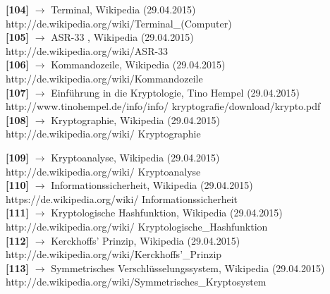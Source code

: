 \documentclass[12pt,a4paper]{report}
\begin{document}
\begin{onehalfspace}
\noindent
\textbf{[104]} $\rightarrow$ Terminal, Wikipedia (29.04.2015)\\
http://de.wikipedia.org/wiki/Terminal\_(Computer)\\

\noindent
\textbf{[105]} $\rightarrow$ ASR-33 , Wikipedia (29.04.2015)\\
http://de.wikipedia.org/wiki/ASR-33\\

\noindent
\textbf{[106]} $\rightarrow$ Kommandozeile, Wikipedia (29.04.2015)\\
http://de.wikipedia.org/wiki/Kommandozeile\\

\noindent
\textbf{[107]} $\rightarrow$ Einführung in die
Kryptologie, Tino Hempel (29.04.2015)\\
http://www.tinohempel.de/info/info/ kryptografie/download/krypto.pdf\\

\noindent
\textbf{[108]} $\rightarrow$ Kryptographie, Wikipedia (29.04.2015)\\
http://de.wikipedia.org/wiki/ Kryptographie\\

\newpage

\noindent
\textbf{[109]} $\rightarrow$ Kryptoanalyse, Wikipedia (29.04.2015)\\
http://de.wikipedia.org/wiki/ Kryptoanalyse\\

\noindent
\textbf{[110]} $\rightarrow$ Informationssicherheit, Wikipedia (29.04.2015)\\
https://de.wikipedia.org/wiki/ Informationssicherheit\\

\noindent
\textbf{[111]} $\rightarrow$ Kryptologische Hashfunktion, Wikipedia (29.04.2015)\\
http://de.wikipedia.org/wiki/ Kryptologische\_Hashfunktion\\

\noindent
\textbf{[112]} $\rightarrow$ Kerckhoffs' Prinzip, Wikipedia (29.04.2015)\\
http://de.wikipedia.org/wiki/Kerckhoffs'\_Prinzip\\

\noindent
\textbf{[113]} $\rightarrow$ Symmetrisches Verschlüsselungssystem, Wikipedia (29.04.2015)\\
http://de.wikipedia.org/wiki/Symmetrisches\_Kryptosystem\\


\end{onehalfspace}
\end{document}
